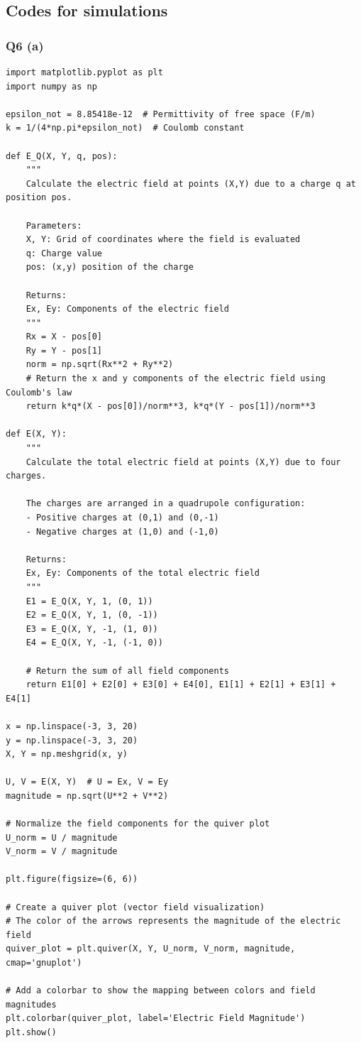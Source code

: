 \documentclass[12pt]{article}
\begin{document}
\subsection*{Codes for simulations}

\subsubsection*{Q6 (a)}
\begin{verbatim}
import matplotlib.pyplot as plt
import numpy as np

epsilon_not = 8.85418e-12  # Permittivity of free space (F/m)
k = 1/(4*np.pi*epsilon_not)  # Coulomb constant

def E_Q(X, Y, q, pos):
    """
    Calculate the electric field at points (X,Y) due to a charge q at position pos.
    
    Parameters:
    X, Y: Grid of coordinates where the field is evaluated
    q: Charge value
    pos: (x,y) position of the charge
    
    Returns:
    Ex, Ey: Components of the electric field
    """
    Rx = X - pos[0] 
    Ry = Y - pos[1]
    norm = np.sqrt(Rx**2 + Ry**2)
    # Return the x and y components of the electric field using Coulomb's law
    return k*q*(X - pos[0])/norm**3, k*q*(Y - pos[1])/norm**3

def E(X, Y):
    """
    Calculate the total electric field at points (X,Y) due to four charges.
    
    The charges are arranged in a quadrupole configuration:
    - Positive charges at (0,1) and (0,-1)
    - Negative charges at (1,0) and (-1,0)
    
    Returns:
    Ex, Ey: Components of the total electric field
    """
    E1 = E_Q(X, Y, 1, (0, 1))
    E2 = E_Q(X, Y, 1, (0, -1))
    E3 = E_Q(X, Y, -1, (1, 0))
    E4 = E_Q(X, Y, -1, (-1, 0))
    
    # Return the sum of all field components
    return E1[0] + E2[0] + E3[0] + E4[0], E1[1] + E2[1] + E3[1] + E4[1]

x = np.linspace(-3, 3, 20)
y = np.linspace(-3, 3, 20)
X, Y = np.meshgrid(x, y)

U, V = E(X, Y)  # U = Ex, V = Ey
magnitude = np.sqrt(U**2 + V**2)

# Normalize the field components for the quiver plot
U_norm = U / magnitude
V_norm = V / magnitude

plt.figure(figsize=(6, 6))

# Create a quiver plot (vector field visualization)
# The color of the arrows represents the magnitude of the electric field
quiver_plot = plt.quiver(X, Y, U_norm, V_norm, magnitude, cmap='gnuplot')

# Add a colorbar to show the mapping between colors and field magnitudes
plt.colorbar(quiver_plot, label='Electric Field Magnitude')
plt.show()
\end{verbatim}
\end{document}
